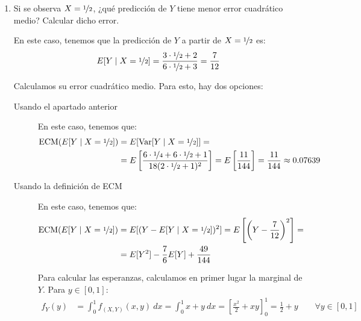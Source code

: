 \begin{ejercicio}
\begin{enumerate}
        \item Si se observa $X = \nicefrac{1}{2}$, ¿qué predicción de $Y$ tiene menor error cuadrático medio? Calcular dicho error.
        
        En este caso, tenemos que la predicción de $Y$ a partir de $X = \nicefrac{1}{2}$ es:
        \begin{equation*}
            E[Y\mid X = \nicefrac{1}{2}] = \dfrac{3\cdot \nicefrac{1}{2}+2}{6\cdot \nicefrac{1}{2}+3} = \dfrac{7}{12}
        \end{equation*}

        Calculamos su error cuadrático medio. Para esto, hay dos opciones:
        \begin{description}
            \item[Usando el apartado anterior] En este caso, tenemos que:
            \begin{align*}
                \text{ECM}(E[Y\mid X = \nicefrac{1}{2}]) &= E[\operatorname{Var}[Y\mid X = \nicefrac{1}{2}]]
                =\\&= E\left[\dfrac{6\cdot \nicefrac{1}{4}+6\cdot \nicefrac{1}{2}+1}{18(2\cdot \nicefrac{1}{2}+1)^2}\right] = E\left[\dfrac{11}{144}\right]
                = \dfrac{11}{144} \approx 0.07639
            \end{align*}

            \item[Usando la definición de ECM] En este caso, tenemos que:
            \begin{align*}
                \text{ECM}(E[Y\mid X = \nicefrac{1}{2}]) &= E[(Y-E[Y\mid X = \nicefrac{1}{2}])^2]
                = E\left[\left(Y-\dfrac{7}{12}\right)^2\right]
                =\\&= E[Y^2]-\dfrac{7}{6}E[Y]+\dfrac{49}{144}
            \end{align*}

            Para calcular las esperanzas, calculamos en primer lugar la marginal de $Y$. Para $y\in [0,1]$:
            \begin{align*}
                f_Y(y) &= \int_{0}^{1} f_{(X,Y)}(x, y) \ dx
                = \int_{0}^{1} x+y \ dx
                = \left[\frac{x^2}{2}+xy\right]_{0}^{1}
                = \frac{1}{2}+y \qquad \forall y\in[0,1]
            \end{align*}


\end{description}
\end{enumerate}
\end{ejercicio}
